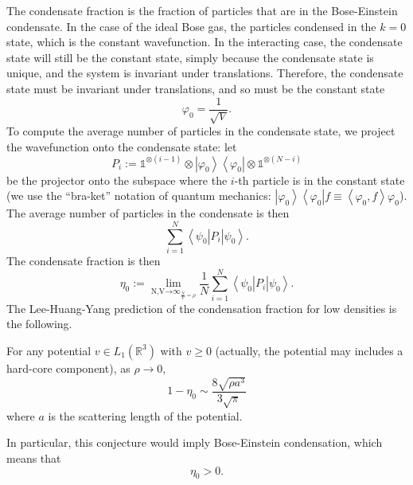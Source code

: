 \documentclass{ian}
\begin{document}
\indent
The condensate fraction is the fraction of particles that are in the Bose-Einstein condensate.
In the case of the ideal Bose gas, the particles condensed in the $k=0$ state, which is the constant wavefunction.
In the interacting case, the condensate state will still be the constant state, simply because the condensate state is unique, and the system is invariant under translations.
Therefore, the condensate state must be invariant under translations, and so must be the constant state
\begin{equation}
  \varphi_0=\frac1{\sqrt V}
  .
\end{equation}
To compute the average number of particles in the condensate state, we project the wavefunction onto the condensate state: let
\begin{equation}
  P_i:=\mathds 1^{\otimes(i-1)}\otimes\left|\varphi_0\right>\left<\varphi_0\right|\otimes \mathds 1^{\otimes(N-i)}
  \label{Pi}
\end{equation}
be the projector onto the subspace where the $i$-th particle is in the constant state (we use the ``bra-ket'' notation of quantum mechanics: $\left|\varphi_0\right>\left<\varphi_0\right|f\equiv\left<\varphi_0,f\right>\varphi_0$).
The average number of particles in the condensate is then
\begin{equation}
  \sum_{i=1}^N\left<\psi_0\right|P_i\left|\psi_0\right>
  .
\end{equation}
The condensate fraction is then
\begin{equation}
  \eta_0:=
  \lim_{\displaystyle\mathop{\scriptstyle N,V\to\infty}_{\frac NV=\rho}}
  \frac1N
  \sum_{i=1}^N\left<\psi_0\right|P_i\left|\psi_0\right>
  .
  \label{eta_Pi}
\end{equation}
The Lee-Huang-Yang prediction of the condensation fraction for low densities is the following.
\bigskip

\label{conjecture:lhy_h}
  For any potential $v\in L_1(\mathbb R^3)$ with $v\geqslant 0$ (actually, the potential may includes a hard-core component), as $\rho\to 0$,
  \begin{equation}
    1-\eta_0\sim\frac{8\sqrt{\rho a^3}}{3\sqrt\pi}
    \label{lhy_h}
  \end{equation}
  where $a$ is the scattering length of the potential.
\endtheo
\bigskip

In particular, this conjecture would imply Bose-Einstein condensation, which means that
\begin{equation}
  \eta_0>0
  .
\end{equation}
\bigskip
\end{document}
